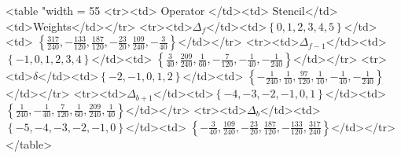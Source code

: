 <table "width = 55%
<tr><td> Operator </td><td> Stencil</td><td>Weights</td></tr>
<tr><td>$\Delta_f$</td><td>$ \left\{0, 1, 2, 3, 4, 5\right\}$</td><td> $\left\{\frac{317}{240},  -\frac{133}{120}, \frac{187}{120}, -\frac{23}{20}, \frac{109}{240}, -\frac{3}{40} \right\}$</td></tr>
<tr><td>$\Delta_{f-1}$</td><td>$\left\{-1, 0, 1, 2, 3, 4\right\}$</td><td> $\left\{\frac{3}{40}, \frac{209}{240}, \frac{1}{60}, -\frac{7}{120}, -\frac{1}{40}, -\frac{1}{240} \right\}$</td></tr>
<tr><td>$\delta$</td><td>$\left\{-2, -1, 0, 1, 2\right\}$</td><td> $\left\{-\frac{1}{240}, \frac{1}{10}, \frac{97}{120}, \frac{1}{10}, -\frac{1}{40}, -\frac{1}{240} \right\}$</td></tr>
<tr><td>$\Delta_{b+1}$</td><td>$\left\{-4, -3, -2, -1, 0, 1\right\}$</td><td> $\left\{\frac{1}{240}, -\frac{1}{40}, \frac{7}{120}, \frac{1}{60}, \frac{209}{240}, \frac{1}{40} \right\}$</td></tr>
<tr><td>$\Delta_b$</td><td>$\left\{-5, -4, -3, -2, -1, 0\right\}$</td><td> $\left\{-\frac{3}{40}, \frac{109}{240}, -\frac{23}{20}, \frac{187}{120}, -\frac{133}{120}, \frac{317}{240} \right\}$</td></tr>
</table>
